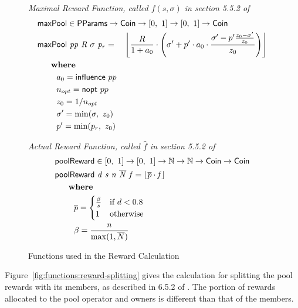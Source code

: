 \begin{figure}[htb]
  \emph{Maximal Reward Function, called $f(s,\sigma)$ in section 5.5.2 of~\cite{delegation_design}}
  \begin{align*}
      & \fun{maxPool} \in \PParams \to \Coin \to \unitInterval \to \unitInterval \to \Coin \\
      & \fun{maxPool}~\var{pp}~\var{R}~\sigma~\var{p_r} =
          ~~~\floor*{
             \frac{R}{1 + a_0}
             \cdot
             \left(
               \sigma' + p'\cdot a_0\cdot\frac{\sigma' - p'\frac{z_0-\sigma'}{z_0}}{z_0}
             \right)} \\
      & ~~~\where \\
      & ~~~~~~~a_0 = \fun{influence}~pp \\
      & ~~~~~~~n_{opt} = \fun{nopt}~pp \\
      & ~~~~~~~z_0 = 1/n_{opt} \\
      & ~~~~~~~\sigma'=\min(\sigma,~z_0) \\
      & ~~~~~~~p'=\min(p_r,~z_0) \\
  \end{align*}

  \emph{Actual Reward Function, called $\hat{f}$ in section 5.5.2 of~\cite{delegation_design}}
  \begin{align*}
      & \fun{poolReward} \in \unitInterval \to \unitInterval \to \N \to \N \to \Coin \to \Coin \\
      & \poolReward{d}{s}{n}{\overline{N}}{f} =
      \floor*{\overline{p}\cdot\var{f}}\\
      & ~~~\where \\
      & ~~~~~~~\overline{p} =
        \begin{cases}
          \frac{\beta}{s} & \text{if } d < 0.8 \\
          1 & \text{otherwise}
        \end{cases} \\
      & ~~~~~~~\beta = \frac{n}{\max(1, \overline{N})} \\
  \end{align*}
  \caption{Functions used in the Reward Calculation}
  \label{fig:functions:rewards}
\end{figure}

\clearpage

Figure~\ref{fig:functions:reward-splitting} gives the calculation for
splitting the pool rewards with its members, as described in 6.5.2 of \cite{delegation_design}.
The portion of rewards allocated to the pool operator and owners is different
than that of the members.

